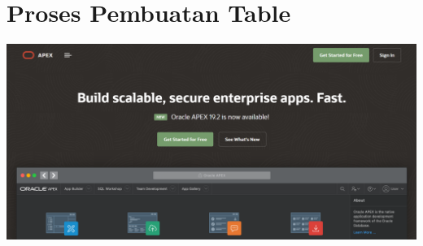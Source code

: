 \documentclass[a4paper, 12pt]{article}
\begin{document}
\section{Proses Pembuatan Table}
\begin{center}
    \includegraphics[width=.8\textwidth]{figure/awalan.PNG}
\end{center}
\end{document}
